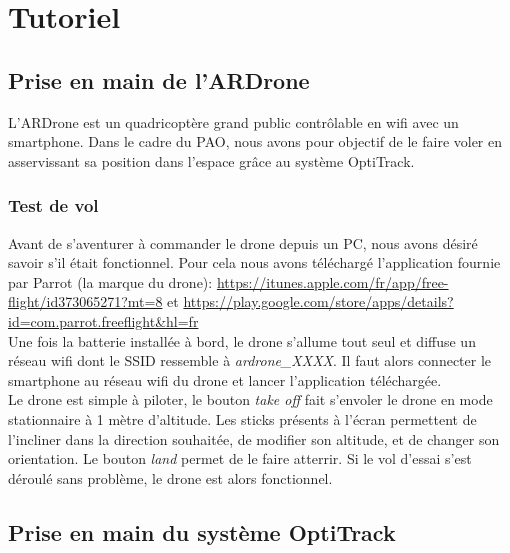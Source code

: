 \chapter{Tutoriel}
    \section{Prise en main de l'ARDrone}
        L'ARDrone est un quadricoptère grand public contrôlable en wifi avec un smartphone. Dans le cadre du PAO, nous avons pour objectif de le faire voler en asservissant sa position dans l'espace grâce au système OptiTrack.

        \subsection{Test de vol}
            Avant de s'aventurer à commander le drone depuis un PC, nous avons désiré savoir s'il était fonctionnel. Pour cela nous avons téléchargé l'application fournie par Parrot (la marque du drone): \url{https://itunes.apple.com/fr/app/free-flight/id373065271?mt=8} et \url{https://play.google.com/store/apps/details?id=com.parrot.freeflight&hl=fr}\\

            Une fois la batterie installée à bord, le drone s'allume tout seul et diffuse un réseau wifi dont le SSID ressemble à \textit{ardrone\_XXXX}. Il faut alors connecter le smartphone au réseau wifi du drone et lancer l'application téléchargée.\\

            Le drone est simple à piloter, le bouton \textit{take off} fait s'envoler le drone en mode stationnaire à 1 mètre d'altitude. Les sticks présents à l'écran permettent de l'incliner dans la direction souhaitée, de modifier son altitude, et de changer son orientation. Le bouton \textit{land} permet de le faire atterrir. Si le vol d'essai s'est déroulé sans problème, le drone est alors fonctionnel.


    \section{Prise en main du système OptiTrack}
